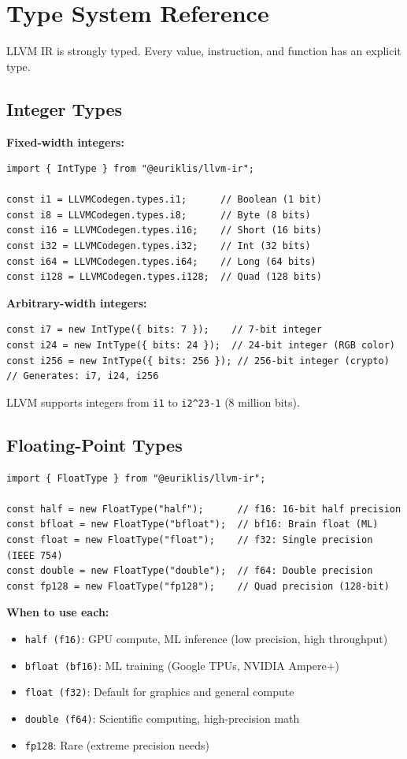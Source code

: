 \documentclass[11pt,oneside]{book}
\begin{document}
\chapter{Type System Reference}

LLVM IR is strongly typed. Every value, instruction, and function has an explicit type.

\section{Integer Types}

\textbf{Fixed-width integers:}
\begin{lstlisting}[style=ts]
import { IntType } from "@euriklis/llvm-ir";

const i1 = LLVMCodegen.types.i1;      // Boolean (1 bit)
const i8 = LLVMCodegen.types.i8;      // Byte (8 bits)
const i16 = LLVMCodegen.types.i16;    // Short (16 bits)
const i32 = LLVMCodegen.types.i32;    // Int (32 bits)
const i64 = LLVMCodegen.types.i64;    // Long (64 bits)
const i128 = LLVMCodegen.types.i128;  // Quad (128 bits)
\end{lstlisting}

\textbf{Arbitrary-width integers:}
\begin{lstlisting}[style=ts]
const i7 = new IntType({ bits: 7 });    // 7-bit integer
const i24 = new IntType({ bits: 24 });  // 24-bit integer (RGB color)
const i256 = new IntType({ bits: 256 }); // 256-bit integer (crypto)
// Generates: i7, i24, i256
\end{lstlisting}

LLVM supports integers from \texttt{i1} to \texttt{i2\^{}23-1} (8 million bits).

\section{Floating-Point Types}

\begin{lstlisting}[style=ts]
import { FloatType } from "@euriklis/llvm-ir";

const half = new FloatType("half");      // f16: 16-bit half precision
const bfloat = new FloatType("bfloat");  // bf16: Brain float (ML)
const float = new FloatType("float");    // f32: Single precision (IEEE 754)
const double = new FloatType("double");  // f64: Double precision
const fp128 = new FloatType("fp128");    // Quad precision (128-bit)
\end{lstlisting}

\textbf{When to use each:}
\begin{itemize}[noitemsep]
  \item \texttt{half (f16)}: GPU compute, ML inference (low precision, high throughput)
  \item \texttt{bfloat (bf16)}: ML training (Google TPUs, NVIDIA Ampere+)
  \item \texttt{float (f32)}: Default for graphics and general compute
  \item \texttt{double (f64)}: Scientific computing, high-precision math
  \item \texttt{fp128}: Rare (extreme precision needs)
\end{itemize}
\end{document}
